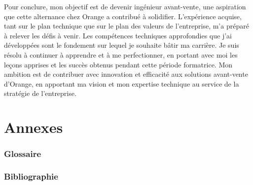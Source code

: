 \documentclass[12pt, a4paper]{article}
\begin{document}
Pour conclure, mon objectif est de devenir ingénieur avant-vente,
une aspiration que cette alternance chez Orange a contribué à solidifier.
L'expérience acquise, tant sur le plan technique que sur le plan des valeurs
de l'entreprise, m'a préparé à relever les défis à venir. Les compétences
techniques approfondies que j'ai développées sont le fondement sur lequel
je souhaite bâtir ma carrière. Je suis résolu à continuer à apprendre et à
me perfectionner, en portant avec moi les leçons apprises et les succès
obtenus pendant cette période formatrice. Mon ambition est de contribuer
avec innovation et efficacité aux solutions avant-vente d'Orange, en
apportant ma vision et mon expertise technique au service de la stratégie
de l'entreprise.
\newpage
\pagestyle{empty}
\appendix
\part{\Large{Annexes}}
\newpage
\parttoc 


\newpage
\pagestyle{fancy}
\glsaddall

\section{Glossaire}
\begingroup
\renewcommand{\addcontentsline}[3]{}
\printglossary[type=\acronymtype, title=Acronymes]
\endgroup

\newpage
\section{Bibliographie}



\newpage
\end{document}
